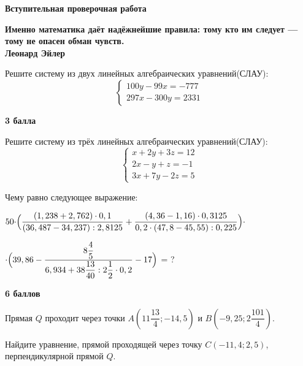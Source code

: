 \centerline{\bf \Huge Вступительная проверочная работа}

\begin{flushright}
        \scriptsize{\textbf{Именно математика даёт надёжнейшие правила: тому кто им следует — тому не опасен обман чувств.\\
         Леонард Эйлер}}
        
\end{flushright}

 Решите систему из двух линейных алгебраических уравнений(СЛАУ):
\begin{equation*}
 \begin{cases}
   100y - 99x = -777
   \\
   297x - 300y = 2331
 \end{cases}
\end{equation*}

\begin{flushright} \textbf{3 балла}\\ 
\end{flushright}

 Решите систему из трёх линейных алгебраических уравнений(СЛАУ):
\begin{equation*}
 \begin{cases}
   x + 2y + 3z = 12
   \\
   2x - y + z = -1
   \\
   3x + 7y - 2z = 5
   
 \end{cases}
\end{equation*}


 Чему равно следующее выражение: 

$50\cdot\Bigr(\dfrac{(1,238+2,762) \cdot 0,1}{(36,487-34,237): 2,8125}+\dfrac{(4,36-1,16) \cdot 0,3125}{0,2 \cdot(47,8-45,55): 0,225}\Bigl)\cdot$ 

$\cdot \Bigr(39,86-\dfrac{8 \dfrac{4}{5}}{6,934+38 \dfrac{13}{40}: 2 \dfrac{1}{2} \cdot 0,2}-17\Bigl)$ = ?

\begin{flushright} \textbf{6 баллов}\\ 
\end{flushright}


 Прямая $Q$ проходит через точки $A(11\dfrac{13}{4};-14,5)$ и $B(-9,25;2\dfrac{101}{4})$.

Найдите уравнение, прямой проходящей через точку $C(-11,4;2,5)$, перпендикулярной прямой $Q$.


